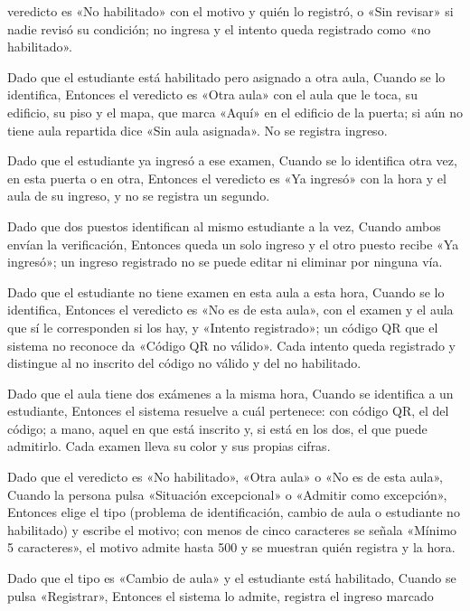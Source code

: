 {      veredicto es «No habilitado» con el motivo y quién lo registró, o «Sin revisar» si
      nadie revisó su condición; no ingresa y el intento queda registrado como «no
      habilitado».
\item Dado que el estudiante está habilitado pero asignado a otra aula, Cuando se lo
      identifica, Entonces el veredicto es «Otra aula» con el aula que le toca, su
      edificio, su piso y el mapa, que marca «Aquí» en el edificio de la puerta; si aún
      no tiene aula repartida dice «Sin aula asignada». No se registra ingreso.
\item Dado que el estudiante ya ingresó a ese examen, Cuando se lo identifica otra vez, en
      esta puerta o en otra, Entonces el veredicto es «Ya ingresó» con la hora y el aula
      de su ingreso, y no se registra un segundo.
\item Dado que dos puestos identifican al mismo estudiante a la vez, Cuando ambos envían
      la verificación, Entonces queda un solo ingreso y el otro puesto recibe «Ya
      ingresó»; un ingreso registrado no se puede editar ni eliminar por ninguna vía.
\item Dado que el estudiante no tiene examen en esta aula a esta hora, Cuando se lo
      identifica, Entonces el veredicto es «No es de esta aula», con el examen y el aula
      que sí le corresponden si los hay, y «Intento registrado»; un código QR que el
      sistema no reconoce da «Código QR no válido». Cada intento queda registrado y
      distingue al no inscrito del código no válido y del no habilitado.
\item Dado que el aula tiene dos exámenes a la misma hora, Cuando se identifica a un
      estudiante, Entonces el sistema resuelve a cuál pertenece: con código QR, el del
      código; a mano, aquel en que está inscrito y, si está en los dos, el que puede
      admitirlo. Cada examen lleva su color y sus propias cifras.
\item Dado que el veredicto es «No habilitado», «Otra aula» o «No es de esta aula»,
      Cuando la persona pulsa «Situación excepcional» o «Admitir como excepción»,
      Entonces elige el tipo (problema de identificación, cambio de aula o estudiante no
      habilitado) y escribe el motivo; con menos de cinco caracteres se señala «Mínimo 5
      caracteres», el motivo admite hasta 500 y se muestran quién registra y la hora.
\item Dado que el tipo es «Cambio de aula» y el estudiante está habilitado, Cuando se
      pulsa «Registrar», Entonces el sistema lo admite, registra el ingreso marcado
}
